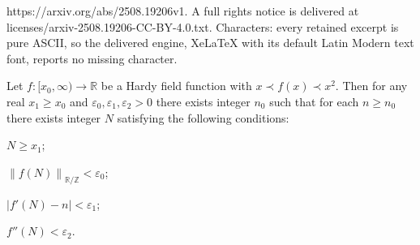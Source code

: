 \documentclass[10pt,a4paper]{amsart}
\newcommand{\RR}{\mathbb{R}}
\newcommand{\ZZ}{\mathbb{Z}}
\newcommand{\abs}[1]{\left|#1\right|}
\newcommand{\e}{\varepsilon}
\newcommand{\fpa}[1]{\left\lVert #1 \right\rVert_{\RR/\ZZ}}
\begin{document}
https://arxiv.org/abs/2508.19206v1. A full rights notice is delivered at licenses/arxiv-2508.19206-CC-BY-4.0.txt. Characters: every retained excerpt is pure ASCII, so the delivered engine, XeLaTeX with its default Latin Modern text font, reports no missing character.
\begin{lemma}
\label{lem:lambda-sufficient}

	Let $f \colon [x_0,\infty) \to \RR$ be a Hardy field function with $x \prec f(x) \prec x^2$. Then for any real $x_1 \geq x_0$ and $\e_0,\e_1,\e_2 > 0$ there exists integer $n_0$ such that for each $n \geq n_0$ there exists integer $N$ satisfying the following conditions:
\begin{inparaenum}
\item $N \geq x_1$;
\item $\fpa{f(N)} < \e_0$;
\item $\abs{f'(N) - n} < \e_1$;
\item $f''(N) < \e_2$.
\end{inparaenum}
\end{lemma}
\end{document}
